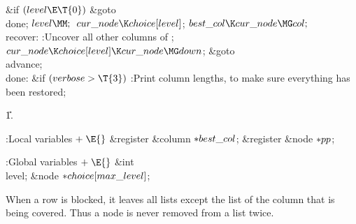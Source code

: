 \&{if} ${}(\\{level}\E\T{0}){}$\1\5
\&{goto} \\{done};\2\6
${}\\{level}\MM;{}$\6
${}\\{cur\_node}\K\\{choice}[\\{level}]{}$;\5
${}\\{best\_col}\K\\{cur\_node}\MG\\{col};{}$\6
\4\\{recover}:\5
:Uncover all other columns of \X;\6
${}\\{cur\_node}\K\\{choice}[\\{level}]\K\\{cur\_node}\MG\\{down}{}$;\5
\&{goto} \\{advance};\6
\4\\{done}:\6
\&{if} ${}(\\{verbose}>\T{3}){}$\1\5
:Print column lengths, to make sure everything has been restored\X;\2\par
\U1.\fi

\B{}:Local variables\X${}\mathrel+\E{}$\6
\&{register} \&{column} ${}{*}\\{best\_col}{}$;\6
\&{register} \&{node} ${}{*}\\{pp}{}$;\par
\fi

\B{}:Global variables\X${}\mathrel+\E{}$\6
\&{int} \\{level};\6
\&{node} ${}{*}\\{choice}[\\{max\_level}]{}$;\par
\fi

When a row is blocked, it leaves all lists except the list
of the
column that is being covered. Thus a node is never removed from a list
twice.

